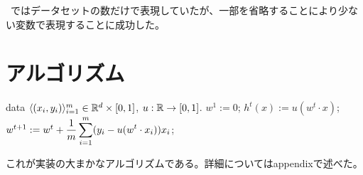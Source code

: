 ~\cite{ichimura}ではデータセットの数だけで表現していたが、一部を省略することにより少ない変数で表現することに成功した。


\section{アルゴリズム}


\begin{algorithm}[]
	\caption{\KAF}
	\label{alg:fixed-u-alg}
\begin{algorithmic}
	 data $\langle (x_i, y_i) \rangle_{i=1}^m \in
	\mathbb{R}^d \times [0, 1]$, $u: \mathbb{R} \rightarrow [0, 1]$.
	\STATE $w^1 := 0$;
	\STATE $h^t(x) := u(w^t \cdot x)$;
	\STATE $w^{t+1} := w^t + \displaystyle\frac{1}{m} \sum_{i=1}^m (y_i - u(w^t
	\cdot x_i)) x_i$;
	\ENDFOR
\end{algorithmic}
\end{algorithm}

これが実装の大まかなアルゴリズムである。詳細についてはappendixで述べた。




